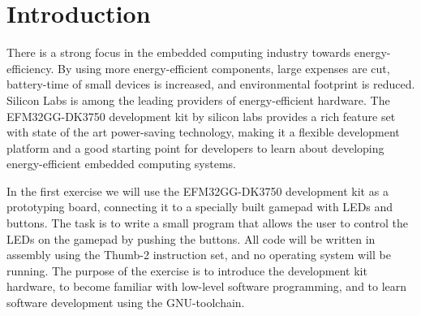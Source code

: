 \chapter{Introduction}

There is a strong focus in the embedded computing industry towards energy-efficiency. By using more energy-efficient components, large expenses are cut, battery-time of small devices is increased, and environmental footprint is reduced. Silicon Labs is among the leading providers of energy-efficient hardware. The EFM32GG-DK3750 development kit by silicon labs provides a rich feature set with state of the art power-saving technology, making it a flexible development platform and a good starting point for developers to learn about developing energy-efficient embedded computing systems.

In the first exercise we will use the EFM32GG-DK3750 development kit as a prototyping board, connecting it to a specially built gamepad with LEDs and buttons. The task is to write a small program that allows the user to control the LEDs on the gamepad by pushing the buttons. All code will be written in assembly using the Thumb-2 instruction set, and no operating system will be running. The purpose of the exercise is to introduce the development kit hardware, to become familiar with low-level software programming, and to learn software development using the GNU-toolchain.
